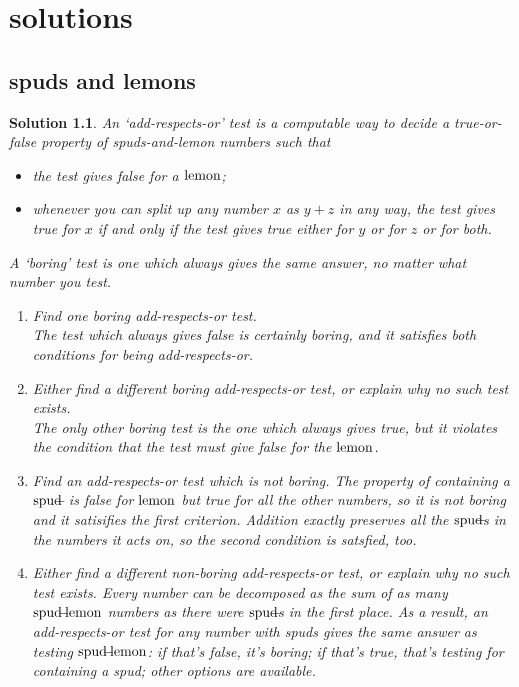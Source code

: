 \documentclass{book}
\begin{document}
\appendix

\chapter{solutions}
\newtheorem{sol}{Solution}[section]

\section{spuds and lemons}

\begin{sol}
  An `add-respects-or' test is a computable way to decide a true-or-false property of spuds-and-lemon numbers such that
  \begin{itemize}
  \item the test gives false for a $\mbox{lemon}$;
    \item whenever you can split up any number $x$ as $y+z$ in any way, the test gives true for $x$ if and only if the test gives true either for $y$ or for $z$ or for both.
  \end{itemize}
  A `boring' test is one which always gives the same answer, no matter what number you test.
  \begin{enumerate}
  \item Find one boring add-respects-or test.\\
    \emph{The test which always gives false is certainly boring, and it satisfies both conditions for being add-respects-or.}
  \item Either find a different boring add-respects-or test, or explain why no such test exists.\\
    \emph{The only other boring test is the one which always gives true, but it violates the condition that the test must give false for the $\mbox{lemon}$.}
  \item Find an add-respects-or test which is \emph{not} boring.
    \emph{The property of containing a $\mbox{spud}\!\!\!-\!\!\!\;$ is false for $\mbox{lemon}$ but true for all the other numbers, so it is not boring and it satisifies the first criterion. Addition exactly preserves all the $\mbox{spud}\!\!\!-\!\!\!\,$s in the numbers it acts on, so the second condition is satsfied, too.}
  \item Either find a different non-boring add-respects-or test, or explain why no such test exists.   \emph{Every number can be decomposed as the sum of as many $\mbox{spud}\!\!\!-\!\!\!\mbox{lemon}$ numbers as there were $\mbox{spud}\!\!\!-\!\!\!\,$s in the first place. As a result, an add-respects-or test for any number with spuds gives the same answer as testing $\mbox{spud}\!\!\!-\!\!\!\mbox{lemon}$: if that's false, it's boring; if that's true, that's testing for containing a spud; other options are available. }
  \end{enumerate}
\end{sol}
\end{document}
